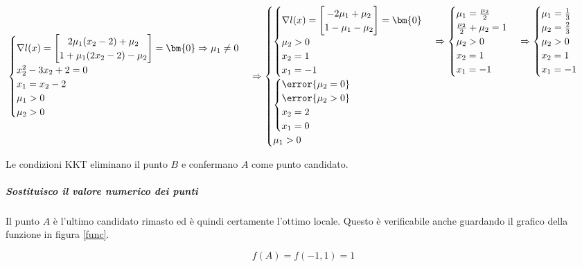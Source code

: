 \documentclass[\main/main.tex]{subfiles}
\begin{document}
\[
  \begin{cases}
    \nabla l(x) = \begin{bmatrix}
      2\mu_1(x_2 - 2) + \mu_2 \\
      1 + \mu_1 (2x_2 - 2) - \mu_2
    \end{bmatrix}
    = \bm{0}  \Rightarrow \mu_1 \neq 0 \\
    x_2^2  -3x_2 + 2 = 0               \\
    x_1 = x_2 - 2                      \\
    \mu_1 > 0                          \\
    \mu_2 > 0
  \end{cases}
  \Rightarrow
  \begin{cases}
    \begin{cases}
      \nabla l(x) = \begin{bmatrix}
        -2\mu_1 + \mu_2 \\
        1 - \mu_1 - \mu_2
      \end{bmatrix}
      = \bm{0}  \\
      \mu_2 > 0 \\
      x_2 = 1   \\
      x_1 = -1
    \end{cases}
    \Rightarrow
    \begin{cases}
      \mu_1 = \frac{\mu_2}{2}     \\
      \frac{\mu_2}{2} + \mu_2 = 1 \\
      \mu_2 > 0                   \\
      x_2 = 1                     \\
      x_1 = -1
    \end{cases}
    \Rightarrow
    \begin{cases}
      \mu_1 = \frac{1}{3} \\
      \mu_2 = \frac{2}{3} \\
      \mu_2 > 0           \\
      x_2 = 1             \\
      x_1 = -1
    \end{cases}
    \\
    \begin{cases}
      \error{\mu_2 = 0} \\
      \error{\mu_2 > 0} \\
      x_2 = 2           \\
      x_1 = 0
    \end{cases} \\
    \mu_1 > 0                  \\
  \end{cases}
\]

Le condizioni KKT eliminano il punto $B$ e confermano $A$ come punto candidato.

\subparagraph*{Sostituisco il valore numerico dei punti}
Il punto $A$ è l'ultimo candidato rimasto ed è quindi certamente l'ottimo locale. Questo è verificabile anche guardando il grafico della funzione in figura \ref{func}.

\[
  f(A) = f(-1, 1) = 1
\]
\end{document}

